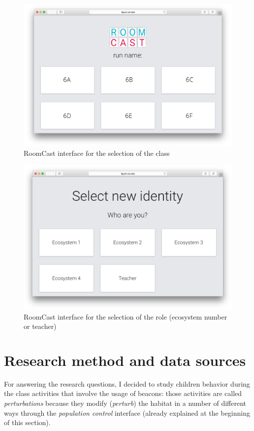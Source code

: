 \begin{figure}
\centering
\includegraphics[width=4.5in]{images/room-cast-classroom-selection.png}
\caption{RoomCast interface for the selection of the class}
\label{fig:roomcast_classroom}
\end{figure}

\begin{figure}
\centering
\includegraphics[width=4.5in]{images/room-cast-habitat-selection.png}
\caption{RoomCast interface for the selection of the role (ecosystem number or teacher)}
\label{fig:roomcast_role}
\end{figure}

\section{Research method and data sources}
For answering the research questions, I decided to study children behavior during the class activities that involve the usage of beacons: those activities are called \textit{perturbations} because they modify (\textit{perturb}) the habitat in a number of different ways through the \textit{population control} interface (already explained at the beginning of this section).

